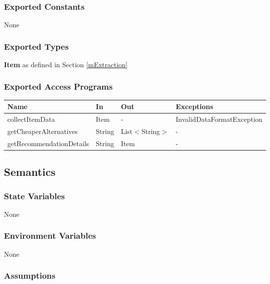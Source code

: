 \documentclass[12pt, titlepage]{article}
\begin{document}
\subsubsection{Exported Constants}

None

\subsubsection{Exported Types}

\textbf{Item} as defined in Section \ref{mExtraction} \\

\subsubsection{Exported Access Programs}

\begin{center}
    \begin{tabular}{p{5cm} p{3cm} p{3cm} p{5cm}}
    \hline
    \textbf{Name} & \textbf{In} & \textbf{Out} & \textbf{Exceptions} \\
    \hline
    collectItemData & Item & - & InvalidDataFormatException \\
    getCheaperAlternatives & String & List$<$String$>$ & - \\
    getRecommendationDetails & String & Item & - \\
    \hline
    \end{tabular}
\end{center}

\subsection{Semantics}

\subsubsection{State Variables}

None

\subsubsection{Environment Variables}

None

\subsubsection{Assumptions}
\end{document}
